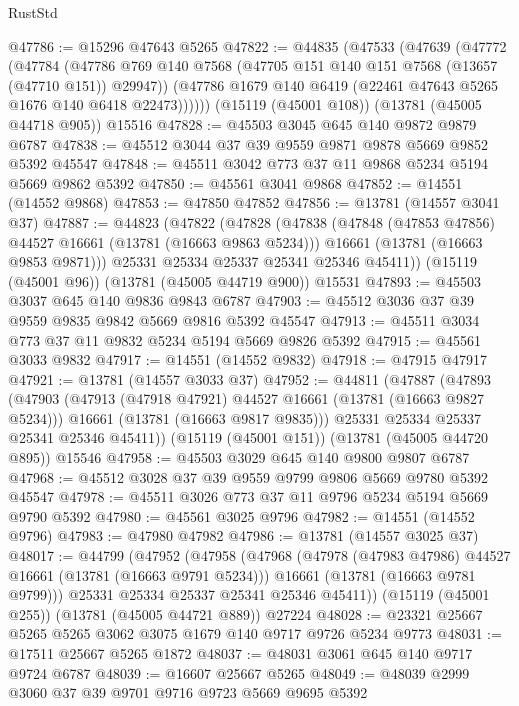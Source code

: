 \begin{lexlean}{RustStd}
\begin{coremodule}
@47786 := @15296 @47643 @5265
@47822 := @44835
    (@47533
      (@47639
        (@47772
          (@47784
            (@47786 @769 @140 @7568 (@47705 @151 @140 @151 @7568 (@13657 (@47710 @151)) @29947))
            (@47786 @1679 @140 @6419 (@22461 @47643 @5265 @1676 @140 @6418 @22473))))))
    (@15119 (@45001 @108))
    (@13781 (@45005 @44718 @905))
    @15516
@47828 := @45503 @3045 @645 @140 @9872 @9879 @6787
@47838 := @45512 @3044 @37 @39 @9559 @9871 @9878 @5669 @9852 @5392 @45547
@47848 := @45511 @3042 @773 @37 @11 @9868 @5234 @5194 @5669 @9862 @5392
@47850 := @45561 @3041 @9868
@47852 := @14551 (@14552 @9868)
@47853 := @47850 @47852
@47856 := @13781 (@14557 @3041 @37)
@47887 := @44823
    (@47822
      (@47828
        (@47838
          (@47848 (@47853 @47856) @44527 @16661 (@13781 (@16663 @9863 @5234)))
          @16661
          (@13781 (@16663 @9853 @9871)))
        @25331
        @25334
        @25337
        @25341
        @25346
        @45411))
    (@15119 (@45001 @96))
    (@13781 (@45005 @44719 @900))
    @15531
@47893 := @45503 @3037 @645 @140 @9836 @9843 @6787
@47903 := @45512 @3036 @37 @39 @9559 @9835 @9842 @5669 @9816 @5392 @45547
@47913 := @45511 @3034 @773 @37 @11 @9832 @5234 @5194 @5669 @9826 @5392
@47915 := @45561 @3033 @9832
@47917 := @14551 (@14552 @9832)
@47918 := @47915 @47917
@47921 := @13781 (@14557 @3033 @37)
@47952 := @44811
    (@47887
      (@47893
        (@47903
          (@47913 (@47918 @47921) @44527 @16661 (@13781 (@16663 @9827 @5234)))
          @16661
          (@13781 (@16663 @9817 @9835)))
        @25331
        @25334
        @25337
        @25341
        @25346
        @45411))
    (@15119 (@45001 @151))
    (@13781 (@45005 @44720 @895))
    @15546
@47958 := @45503 @3029 @645 @140 @9800 @9807 @6787
@47968 := @45512 @3028 @37 @39 @9559 @9799 @9806 @5669 @9780 @5392 @45547
@47978 := @45511 @3026 @773 @37 @11 @9796 @5234 @5194 @5669 @9790 @5392
@47980 := @45561 @3025 @9796
@47982 := @14551 (@14552 @9796)
@47983 := @47980 @47982
@47986 := @13781 (@14557 @3025 @37)
@48017 := @44799
    (@47952
      (@47958
        (@47968
          (@47978 (@47983 @47986) @44527 @16661 (@13781 (@16663 @9791 @5234)))
          @16661
          (@13781 (@16663 @9781 @9799)))
        @25331
        @25334
        @25337
        @25341
        @25346
        @45411))
    (@15119 (@45001 @255))
    (@13781 (@45005 @44721 @889))
    @27224
@48028 := @23321 @25667 @5265 @5265 @3062 @3075 @1679 @140 @9717 @9726 @5234 @9773
@48031 := @17511 @25667 @5265 @1872
@48037 := @48031 @3061 @645 @140 @9717 @9724 @6787
@48039 := @16607 @25667 @5265
@48049 := @48039 @2999 @3060 @37 @39 @9701 @9716 @9723 @5669 @9695 @5392

\end{coremodule}
\end{lexlean}
